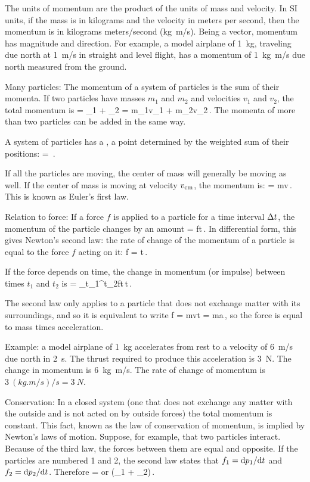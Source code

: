The units of momentum are the product of the units of mass and velocity. In SI units, if the mass is in kilograms and the velocity in meters per second, then the momentum is in kilograms meters/second (\si{kg.m/s}). Being a vector, momentum has magnitude and direction. For example, a model airplane of \SI{1}{kg}, traveling due north at \SI{1}{m/s} in straight and level flight, has a momentum of \SI{1}{kg.m/s} due north measured from the ground.

Many particles: The momentum of a system of particles is the sum of their momenta. If two particles have masses $m_1$ and $m_2$ and velocities $v_1$ and $v_2$, the total momentum is
\beq
\lmom = \lmom_1 + \lmom_2 = m_1v_1 + m_2v_2\,.
\eeq
The momenta of more than two particles can be added in the same way.

A system of particles has a , a point determined by the weighted sum of their positions:
\beq
\pvec{} = \,.
\eeq

If all the particles are moving, the center of mass will generally be moving as well. If the center of mass is moving at velocity $v_\text{cm}$, the momentum is:
\beq
\lmom = mv\,.
\eeq
This is known as Euler's first law.

Relation to force: If a force $f$ is applied to a particle for a time interval $\Delta t$, the momentum of the particle changes by an amount
\beq
\diff\lmom = f\diff t\,.
\eeq
In differential form, this gives Newton's second law: the rate of change of the momentum of a particle is equal to the force $f$ acting on it:
\beq
f = \xod\lmom t\,.
\eeq

If the force depends on time, the change in momentum (or impulse) between times $t_1$ and $t_2$ is
\beq
\diff\lmom = \int_{t_1}^{t_2}f\vat t\,\dx t\,.
\eeq

The second law only applies to a particle that does not exchange matter with its surroundings, and so it is equivalent to write
\beq
f = m\xod vt = ma\,,
\eeq
so the force is equal to mass times acceleration.

Example: a model airplane of \SI{1}{kg} accelerates from rest to a velocity of \SI{6}{m/s} due north in \SI{2}{s}. The thrust required to produce this acceleration is \SI{3}{N}. The change in momentum is \SI{6}{kg.m/s}. The rate of change of momentum is $\SI{3}{(kg.m/s)/s} = \SI{3}{N}$.


Conservation: In a closed system (one that does not exchange any matter with the outside and is not acted on by outside forces) the total momentum is constant. This fact, known as the law of conservation of momentum, is implied by Newton's laws of motion. Suppose, for example, that two particles interact. Because of the third law, the forces between them are equal and opposite. If the particles are numbered 1 and 2, the second law states that $f_1 = \text{d}p_1/\text{d} t$ and $f_2 = \text{d}p_2/\text{d} t$. Therefore
\beq
{} = 
\eeq
or
\beq
{}\left(\lmom_1 + \lmom_2\right)\,.
\eeq


